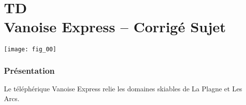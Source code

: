\chapter*{TD  \\ 
Vanoise Express -- 
\ifprof Corrigé \else Sujet \fi}

\iflivret {} \else
\ifprof  {} \else \fi
\fi

\setcounter{question}{0}


\begin{marginfigure} %
\centering
\texttt{[image: fig\_00]}
\end{marginfigure}






\subsection*{Présentation}


Le téléphérique Vanoise Express relie les domaines skiables de La Plagne et Les Arcs.%

	


